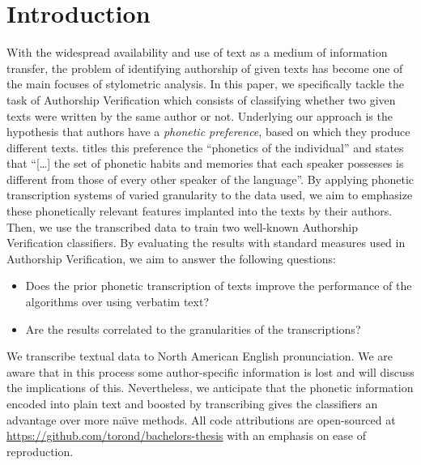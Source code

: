 \chapter{Introduction}\label{introduction}
With the widespread availability and use of text as a medium of information transfer, the problem of identifying authorship of given texts has become one of the main focuses of stylometric analysis.
In this paper, we specifically tackle the task of Authorship Verification which consists of classifying whether two given texts were written by the same author or not.
Underlying our approach is the hypothesis that authors have a \textit{phonetic preference}, based on which they produce different texts.
\cite{ladefoged2014courseInPhonetics} titles this preference the ``phonetics of the individual'' and states that ``[\ldots] the set of phonetic habits and memories that each speaker possesses is different from those of every other speaker of the language''.
By applying phonetic transcription systems of varied granularity to the data used, we aim to emphasize these phonetically relevant features implanted into the texts by their authors.
Then, we use the transcribed data to train two well-known Authorship Verification classifiers.
By evaluating the results with standard measures used in Authorship Verification, we aim to answer the following questions:
\begin{itemize}
  \item Does the prior phonetic transcription of texts improve the performance of the algorithms over using verbatim text?
  \item Are the results correlated to the granularities of the transcriptions?
\end{itemize}
We transcribe textual data to North American English pronunciation.
We are aware that in this process some author-specific information is lost and will discuss the implications of this.
Nevertheless, we anticipate that the phonetic information encoded into plain text and boosted by transcribing gives the classifiers an advantage over more na\"{\i}ve methods.
All code attributions are open-sourced at \url{https://github.com/torond/bachelors-thesis} with an emphasis on ease of reproduction.